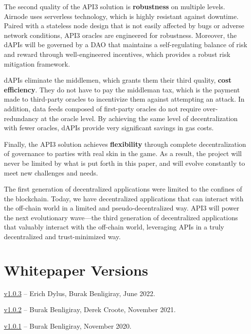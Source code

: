 \documentclass[11pt]{article}
\begin{document}
The second quality of the API3 solution is \textbf{robustness} on multiple levels.
Airnode uses serverless technology, which is highly resistant against downtime.
Paired with a stateless node design that is not easily affected by bugs or adverse network conditions, API3 oracles are engineered for robustness.
Moreover, the dAPIs will be governed by a DAO that maintains a self-regulating balance of risk and reward through well-engineered incentives, which provides a robust risk mitigation framework.

dAPIs eliminate the middlemen, which grants them their third quality, \textbf{cost efficiency}.
They do not have to pay the middleman tax, which is the payment made to third-party oracles to incentivize them against attempting an attack.
In addition, data feeds composed of first-party oracles do not require over-redundancy at the oracle level.
By achieving the same level of decentralization with fewer oracles, dAPIs provide very significant savings in gas costs.

Finally, the API3 solution achieves \textbf{flexibility} through complete decentralization of governance to parties with real skin in the game.
As a result, the project will never be limited by what is put forth in this paper, and will evolve constantly to meet new challenges and needs.

The first generation of decentralized applications were limited to the confines of the blockchain.
Today, we have decentralized applications that can interact with the off-chain world in a limited and pseudo-decentralized way.
API3 will power the next evolutionary wave---the third generation of decentralized applications that valuably interact with the off-chain world, leveraging APIs in a truly decentralized and trust-minimized way.

\small



\newpage
\normalsize
\appendix
\section{Whitepaper Versions}
\label{sec:versions}

\href{https://github.com/api3dao/api3-whitepaper/releases/tag/v1.0.3}{v1.0.3} -- Erich Dylus, Burak Benligiray, June 2022.

\href{https://github.com/api3dao/api3-whitepaper/releases/tag/v1.0.2}{v1.0.2} -- Burak Benligiray, Derek Croote, November 2021.

\href{https://github.com/api3dao/api3-whitepaper/releases/tag/v1.0.1}{v1.0.1} -- Burak Benligiray, November 2020.
\end{document}

